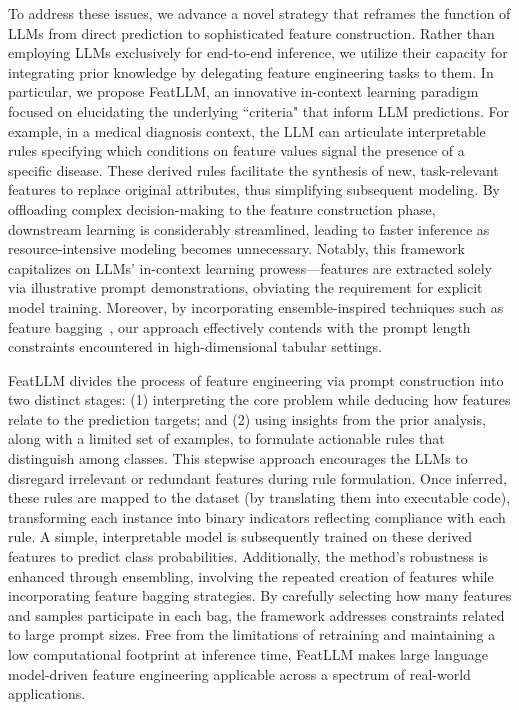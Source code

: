 To address these issues, we advance a novel strategy that reframes the function of LLMs from direct prediction to sophisticated feature construction. Rather than employing LLMs exclusively for end-to-end inference, we utilize their capacity for integrating prior knowledge by delegating feature engineering tasks to them. In particular, we propose \textsf{FeatLLM}, an innovative in-context learning paradigm focused on elucidating the underlying ``criteria" that inform LLM predictions. For example, in a medical diagnosis context, the LLM can articulate interpretable rules specifying which conditions on feature values signal the presence of a specific disease. These derived rules facilitate the synthesis of new, task-relevant features to replace original attributes, thus simplifying subsequent modeling. By offloading complex decision-making to the feature construction phase, downstream learning is considerably streamlined, leading to faster inference as resource-intensive modeling becomes unnecessary. Notably, this framework capitalizes on LLMs' in-context learning prowess—features are extracted solely via illustrative prompt demonstrations, obviating the requirement for explicit model training. Moreover, by incorporating ensemble-inspired techniques such as feature bagging~\cite{breiman2001random}, our approach effectively contends with the prompt length constraints encountered in high-dimensional tabular settings.

\textsf{FeatLLM} divides the process of feature engineering via prompt construction into two distinct stages: (1) interpreting the core problem while deducing how features relate to the prediction targets; and (2) using insights from the prior analysis, along with a limited set of examples, to formulate actionable rules that distinguish among classes. This stepwise approach encourages the LLMs to disregard irrelevant or redundant features during rule formulation. Once inferred, these rules are mapped to the dataset (by translating them into executable code), transforming each instance into binary indicators reflecting compliance with each rule. A simple, interpretable model is subsequently trained on these derived features to predict class probabilities. Additionally, the method’s robustness is enhanced through ensembling, involving the repeated creation of features while incorporating feature bagging strategies. By carefully selecting how many features and samples participate in each bag, the framework addresses constraints related to large prompt sizes. Free from the limitations of retraining and maintaining a low computational footprint at inference time, \textsf{FeatLLM} makes large language model-driven feature engineering applicable across a spectrum of real-world applications.

